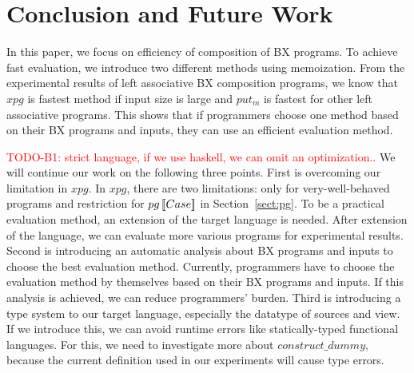 \section{Conclusion and Future Work} \label{sect:conclusion}

In this paper, we focus on efficiency of composition of BX programs.
To achieve fast evaluation, we introduce two different methods using memoization.
From the experimental results of left associative BX composition programs, we know that $xpg$ is fastest method if input size is large and
$put_m$ is fastest for other left associative programs.
This shows that if programmers choose one method based on their BX programs and inputs, they can use an efficient evaluation method. 


\textcolor{red}{TODO-B1: strict language, if we use haskell, we can omit an optimization..}
We will continue our work on the following three points.
First is overcoming our limitation in $xpg$. In $xpg$, there are two limitations: only for very-well-behaved programs and restriction for $pg \, [\![Case]\!]$ in Section~\ref{sect:pg}. To be a practical evaluation method, an extension of the target language is needed. After extension of the language, we can evaluate more various programs for experimental results.
Second is introducing an automatic analysis about BX programs and inputs to choose the best evaluation method.
Currently, programmers have to choose the evaluation method by themselves based on their BX programs and inputs. If this analysis is achieved, we can reduce programmers' burden.
Third is introducing a type system to our target language, especially the datatype of sources and view. If we introduce this, we can avoid runtime errors like statically-typed functional languages. For this, we need to investigate more about $construct\_dummy$, because the current definition used in our experiments %
will cause type errors. 





